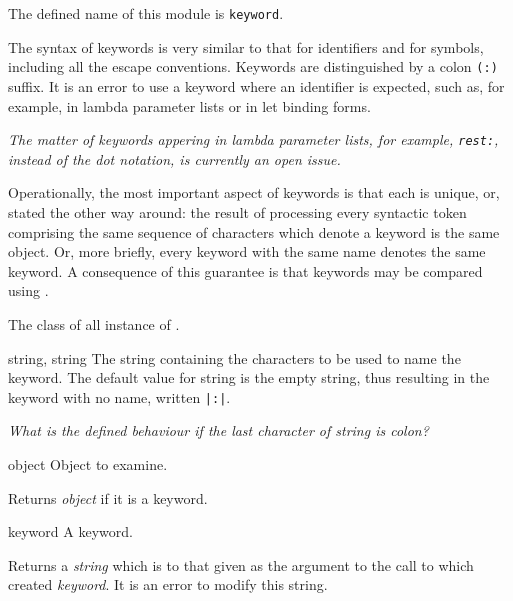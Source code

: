\label{keyword}
%
\begin{optDefinition}
The defined name of this module is {\tt keyword}.

%
The syntax of keywords is very similar to that for identifiers and for symbols,
including all the escape
conventions. Keywords are distinguished by a colon {\tt (:)} suffix.  It is an error to use a
keyword where an identifier is expected, such as, for example, in lambda
parameter lists or in let binding forms.

{\em The matter of keywords appering in lambda parameter lists, for example,
    {\tt rest:}, instead of the dot notation, is currently an open issue.}

Operationally, the most important aspect of keywords is that each is unique, or,
stated the other way around: the result of processing every syntactic token
comprising the same sequence of characters which denote a keyword is the same
object. Or, more briefly, every keyword with the same name denotes the same
keyword. A consequence of this guarantee is that keywords may be compared using
.

%
The class of all instance of .
%
\begin{initoptions}
    \item[string, string] The string containing the characters to be used to
    name the keyword. The default value for string is the empty string, thus
    resulting in the keyword with no name, written \verb+|:|+.
\end{initoptions}
%
{\em What is the defined behaviour if the last character of string is colon?}

%
\begin{arguments}
    \item[object] Object to examine.
\end{arguments}
%
\result%
Returns {\em object\/} if it is a keyword.

%
\begin{arguments}
    \item[keyword] A keyword.
\end{arguments}
%
\result%
Returns a {\em string\/} which is  to that given as the
argument to the call to  which created {\em keyword}. It is an
error to modify this string.


\end{optDefinition}
